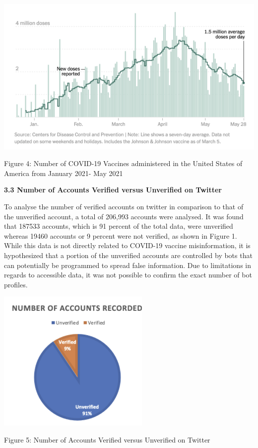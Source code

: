 \documentclass[10pt,twocolumn,letterpaper]{article}
\begin{document}
\vspace{\baselineskip}

\includegraphics[scale=0.5]{fig4.png}
\caption{Figure 4: Number of COVID-19 Vaccines administered in the United States of America from January 2021- May 2021}

\vspace{\baselineskip}

\textbf{3.3 Number of Accounts Verified versus Unverified on Twitter}
\vspace{\baselineskip}

To analyse the number of verified accounts on twitter in comparison to that of the unverified account, a total of 206,993 accounts were analysed. It was found that 187533 accounts, which is 91 percent of the total data, were unverified whereas 19460 accounts or 9 percent were not verified, as shown in Figure 1. While this data is not directly related to COVID-19 vaccine misinformation, it is hypothesized that a portion of the unverified accounts are controlled by bots that can potentially be programmed to spread false information. Due to limitations in regards to accessible data, it was not possible to confirm the exact number of bot profiles. 

\includegraphics[scale=1.45]{fig5.png}
\caption{Figure 5: Number of Accounts Verified versus Unverified on Twitter}
\end{document}
